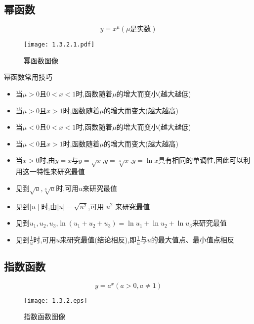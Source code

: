 \documentclass[12pt, a4paper, oneside, UTF8]{ctexbook}  %
\begin{document}
\begin{sloppypar}
    \subsection{幂函数}
    $$
        y=x^{\mu}(\mu \text{是实数})
    $$
    \begin{figure}[H]
        \centering
        \texttt{[image: 1.3.2.1.pdf]}
        \caption{幂函数图像}
        \label{fig1}
    \end{figure}
    \begin{criterion}{幂函数常用技巧}{}
        \begin{itemize}
            \item 当$\mu>0$且$0<x<1$时,函数随着$\mu$的增大而变小(越大越低)
            \item 当$\mu >0$且$x>1$时,函数随着$\mu$的增大而变大(越大越高)
            \item 当$\mu <0$且$0<x<1$时,函数随着$\mu$的增大而变小(越大越低)
            \item 当$\mu <0$且$x>1$时,函数随着$\mu$的增大而变大(越大越高)
            \item 当$x>0$时,由$y=x$与$y=\sqrt{x}$,$y=\sqrt[3]{x}$,$y=\ln x$具有相同的单调性,因此可以利用这一特性来研究最值
            \item 见到$\sqrt{u}$,$\sqrt[3]{u}$时,可用$u$来研究最值
            \item 见到$\mid u\mid$时,由$\mid u\mid=\sqrt{u^2}$,可用 $u^2$ 来研究最值
            \item 见到$u_1,u_2,u_3$,$\ln (u_1+u_2+u_3)=\ln u_{1}+\ln u_{2}+\ln u_{3}$来研究最值
            \item 见到$\frac{1}{u}$时,可用$u$来研究最值(结论相反),即$\frac{1}{u}$与$u$的最大值点、最小值点相反
        \end{itemize}
    \end{criterion}
    \subsection{指数函数}
    $$
        y=a^x (a>0,a \neq 1)
    $$
    \begin{figure}[H]
        \centering \texttt{[image: 1.3.2.eps]} \caption{指数函数图像}
    \end{figure}


\end{sloppypar}
\end{document}
